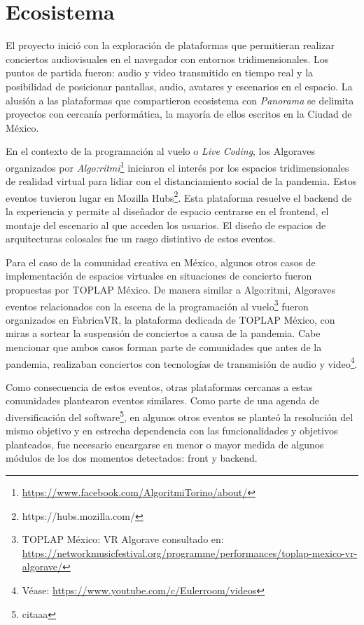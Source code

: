 
\section*{Ecosistema} %

El proyecto inició con la exploración de plataformas que permitieran realizar conciertos audiovisuales en el navegador con entornos tridimensionales. Los puntos de partida fueron: audio y video transmitido en tiempo real y la posibilidad de posicionar pantallas, audio, avatares y escenarios en el espacio. La alusión a las plataformas que compartieron ecosistema con \textit{Panorama} se delimita proyectos con cercanía performática, la mayoría de ellos escritos en la Ciudad de México. 

En el contexto de la programación al vuelo o \textit{Live Coding}, los Algoraves organizados por \textit{Algo:ritmi}\footnote{\url{https://www.facebook.com/AlgoritmiTorino/about/}} iniciaron el interés por los espacios tridimensionales de realidad virtual para lidiar con el distanciamiento social de la pandemia. Estos eventos tuvieron lugar en Mozilla Hubs\footnote{https://hubs.mozilla.com/}. Esta plataforma resuelve el backend de la experiencia y permite al diseñador de espacio centrarse en el frontend, el montaje del escenario al que acceden los usuarios. El diseño de espacios de arquitecturas colosales fue un rasgo distintivo de estos eventos. 

Para el caso de la comunidad creativa en México, algunos otros casos de implementación de espacios virtuales en situaciones de concierto fueron propuestas por TOPLAP México. De manera similar a Algo:ritmi, Algoraves eventos relacionados con la escena de la programación al vuelo\footnote{TOPLAP México: VR Algorave consultado en: \url{https://networkmusicfestival.org/programme/performances/toplap-mexico-vr-algorave/}} fueron organizados en FabricaVR, la plataforma dedicada de TOPLAP México, con miras a sortear la suspensión de conciertos a causa de la pandemia. Cabe mencionar que ambos casos forman parte de comunidades que antes de la pandemia, realizaban conciertos con tecnologías de transmisión de audio y video\footnote{Véase: \url{https://www.youtube.com/c/Eulerroom/videos}}.%

Como consecuencia de estos eventos, otras plataformas cercanas a estas comunidades plantearon eventos similares. Como parte de una agenda de diversificación del software\footnote{citaaa}, en algunos otros eventos se planteó la resolución del mismo objetivo y en estrecha dependencia con las funcionalidades y objetivos planteados, fue necesario encargarse en menor o mayor medida de algunos módulos de los dos momentos detectados: front y backend.  


